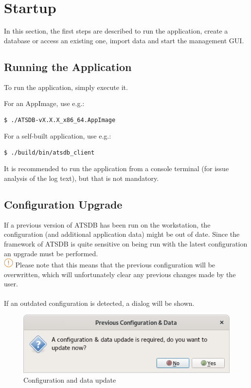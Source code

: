 \chapter{Startup}
\label{sec:startup} 

In this section, the first steps are described to run the application, create a database or access an existing one, import data and start the management GUI.

\section{Running the Application}

To run the application, simply execute it.

For an AppImage, use e.g.:
\begin{verbatim}
$ ./ATSDB-vX.X.X_x86_64.AppImage
\end{verbatim}

For a self-built application, use e.g.:
\begin{verbatim}
$ ./build/bin/atsdb_client
\end{verbatim}

It is recommended to run the application from a console terminal (for issue analysis of the log text), but that is not mandatory.

\section{Configuration Upgrade}

If a previous version of ATSDB has been run on the workstation, the configuration (and additional application data) might be out of date. Since the framework of ATSDB is quite sensitive on being run with the latest configuration an upgrade must be performed. \\

\includegraphics[width=0.5cm]{../../data/icons/hint.png} Please note that this means that the previous configuration will be overwritten, which will unfortunately clear any previous changes made by the user. \\\\

If an outdated configuration is detected, a dialog will be shown.

\begin{figure}[H]
    \includegraphics[width=12cm,frame]{../screenshots/config_data_update.png}
  \caption{Configuration and data update}
  \label{fig:db_connect}
\end{figure}

